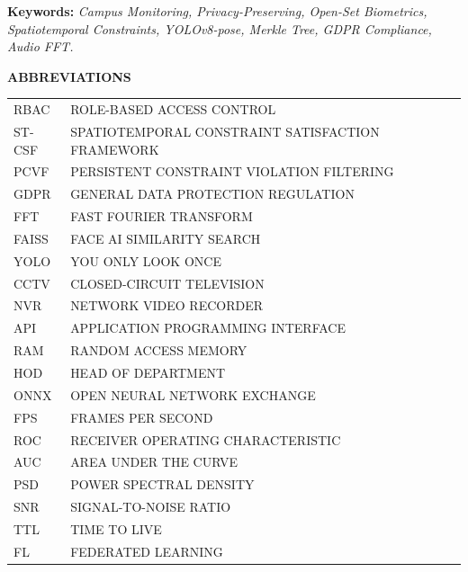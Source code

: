 \documentclass[12pt,a4paper,oneside]{report}
\begin{document}
\vspace{0.2in}
\noindent \textbf{Keywords:} \textit{Campus Monitoring, Privacy-Preserving, Open-Set Biometrics, Spatiotemporal Constraints, YOLOv8-pose, Merkle Tree, GDPR Compliance, Audio FFT.}

\newpage
\clearpage
\tableofcontents

\newpage
\clearpage
\listoffigures

\newpage
\clearpage
\listoftables

\newpage
\begin{center}
    \fontsize{12}{14}\bfseries{ABBREVIATIONS}
\end{center}
\vspace{0.2in}
\begin{tabular}{@{}l p{5.0in}@{}}
    RBAC & ROLE-BASED ACCESS CONTROL \\
    ST-CSF & SPATIOTEMPORAL CONSTRAINT SATISFACTION FRAMEWORK \\
    PCVF & PERSISTENT CONSTRAINT VIOLATION FILTERING \\
    GDPR & GENERAL DATA PROTECTION REGULATION \\
    FFT & FAST FOURIER TRANSFORM \\
    FAISS & FACE AI SIMILARITY SEARCH \\
    YOLO & YOU ONLY LOOK ONCE \\
    CCTV & CLOSED-CIRCUIT TELEVISION \\
    NVR & NETWORK VIDEO RECORDER \\
    API & APPLICATION PROGRAMMING INTERFACE \\
    RAM & RANDOM ACCESS MEMORY \\
    HOD & HEAD OF DEPARTMENT \\
    ONNX & OPEN NEURAL NETWORK EXCHANGE \\
    FPS & FRAMES PER SECOND \\
    ROC & RECEIVER OPERATING CHARACTERISTIC \\
    AUC & AREA UNDER THE CURVE \\
    PSD & POWER SPECTRAL DENSITY \\
    SNR & SIGNAL-TO-NOISE RATIO \\
    TTL & TIME TO LIVE \\
    FL & FEDERATED LEARNING \\
\end{tabular}
\end{document}
